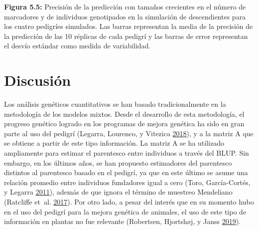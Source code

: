 \documentclass[11pt,spanish,a4paper,oneside,]{book} %
\begin{document}
\noindent
\textbf{Figura 5.5:} Precisión de la predicción con tamaños crecientes en el número de marcadores y de individuos genotipados en la simulación de descendientes para los cuatro pedigríes simulados. Las barras representan la media de la precisión de la predicción de las 10 réplicas de cada pedigrí y las barras de error representan el desvío estándar como medida de variabilidad.

\hypertarget{discusiuxf3n}{%
\chapter{Discusión}\label{discusiuxf3n}}

Los análisis genéticos cuantitativos se han basado tradicionalmente en la metodología de los modelos mixtos. Desde el desarrollo de esta metodología, el progreso genético logrado en los programas de mejora genética ha sido en gran parte al uso del pedigrí (Legarra, Lourenco, y Vitezica \protect\hyperlink{ref-cite:30}{2018}), y a la matriz A que se obtiene a partir de este tipo información. La matriz A se ha utilizado ampliamente para estimar el parentesco entre individuos a través del BLUP. Sin embargo, en los últimos años, se han propuesto estimadores del parentesco distintos al parentesco basado en el pedigrí, ya que en este último se asume una relación promedio entre individuos fundadores igual a cero (Toro, García-Cortés, y Legarra \protect\hyperlink{ref-cite:71}{2011}), además de que ignora el término de muestreo Mendeliano (Ratcliffe et~al. \protect\hyperlink{ref-cite:72}{2017}). Por otro lado, a pesar del interés que en su momento hubo en el uso del pedigrí para la mejora genética de animales, el uso de este tipo de información en plantas no fue relevante (Robertsen, Hjortshøj, y Janss \protect\hyperlink{ref-cite:63}{2019}).
\end{document}
